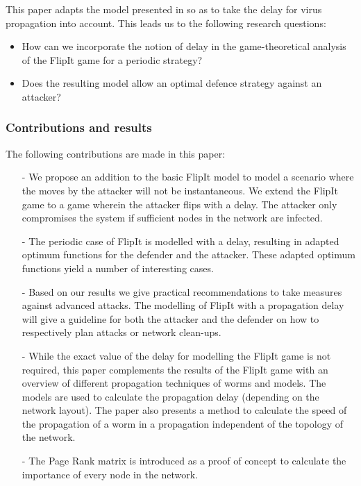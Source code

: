 This paper adapts the model presented in \cite{FlipIt} so as to take the delay for virus propagation into account.
This leads us to the following research questions:
\begin{itemize}
\item How can we incorporate the notion of delay in the game-theoretical analysis of the FlipIt game for a periodic strategy?
\item Does the resulting model allow an optimal defence strategy against an attacker? 
\end{itemize}

\subsubsection{Contributions and results}
The following contributions are made in this paper:
\begin{itemize}
\item[-] We propose an addition to the basic FlipIt model to model a scenario where the moves by the attacker will not be instantaneous. We extend the FlipIt game to a game wherein the attacker flips with a delay. The attacker only compromises the system if sufficient nodes in the network are infected. 
\item[-] The periodic case of FlipIt is modelled with a delay, resulting in adapted optimum functions for the defender and the attacker. These adapted optimum functions yield a number of interesting cases.
\item[-] Based on our results we give practical recommendations to take measures against advanced attacks.  The modelling of FlipIt with a propagation delay will give a guideline for both the attacker and the defender on how to respectively plan attacks or network clean-ups.
\item[-] While the exact value of the delay for modelling the FlipIt game is not required, this paper complements the results of the FlipIt game with an overview of different propagation techniques of worms and models. The models are used to calculate the propagation delay (depending on the network layout). The paper also presents a method to calculate the speed of the propagation of a worm in a propagation independent of the topology of the network.
\item[-] The Page Rank matrix is introduced as a proof of concept to calculate the importance of every node in the network.
\end{itemize}


